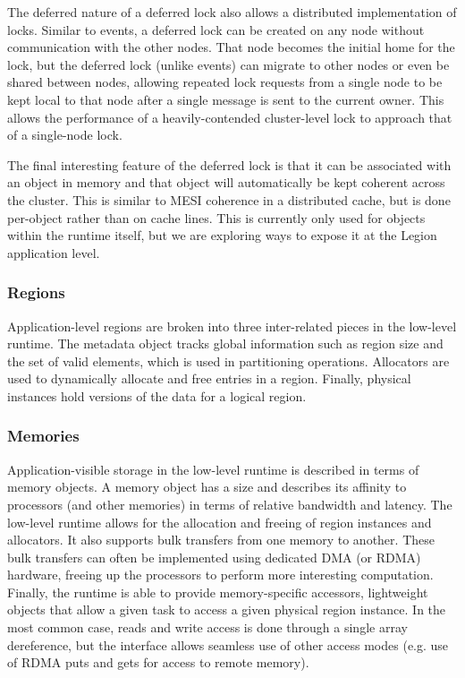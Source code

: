 The deferred nature of a deferred lock also allows a distributed implementation
of locks.  Similar to events, a deferred lock can be created on any node
without communication with the other nodes.  That node becomes
the initial home for the lock, but the deferred lock (unlike events) can 
migrate to other nodes or even be shared between nodes, allowing repeated
lock requests from a single node to be kept local to that node after a single
message is sent to the current owner.  
This allows the performance of a
heavily-contended cluster-level lock to approach that of a single-node lock.

The final interesting feature of the deferred lock is that it can be associated
with an object in memory and that object will automatically be kept coherent
across the cluster.  This is similar to MESI coherence in a distributed cache,
but is done per-object rather than on cache lines.  This is currently only 
used for objects within the runtime itself, but we are exploring ways to expose
it at the Legion application level.

\subsubsection{Regions}
\label{subsec:regionmeta}
Application-level regions are broken into three inter-related pieces in the
low-level runtime.  The metadata object tracks global information such as
region size and the set of valid elements, which is used in partitioning
operations.  Allocators are used to dynamically allocate and
free entries in a region.  Finally, physical instances hold versions of the data for 
a logical region.

\subsubsection{Memories}
\label{subsec:memories}
Application-visible storage in the low-level runtime is described in terms of
memory objects.  A memory object has a size and describes its affinity to 
processors (and other memories) in terms of relative bandwidth and latency.
The low-level runtime allows for the allocation and freeing of region instances
and allocators.  It also supports bulk transfers from one memory to another.
These bulk transfers can often be implemented using dedicated DMA (or RDMA)
hardware, freeing up the processors to perform more interesting
computation.  Finally, the runtime is able to provide memory-specific accessors,
lightweight objects that allow a given task to access a given physical region
instance.  In the most common case, reads and write access is done through a 
single array dereference, but the interface allows seamless use of other
access modes (e.g. use of RDMA puts and gets for access to remote memory).

